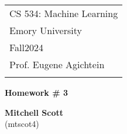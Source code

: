 \documentclass[a4paper,12pt]{article}
\theoremstyle{definition}
\theoremstyle{remark}
\begin{document}
	
	
	
	
	
	\thispagestyle{empty} %
	
	\begin{tabular}{p{15.5cm}} %
		{\large \sc CS 534:  Machine Learning} \\
		Emory University \\ Fall2024 \\ Prof. Eugene Agichtein \\
		\hline %
		\\
	\end{tabular} %
	
	\vspace*{0.3cm} %
	
	\begin{center} %
		{\Large \bf Homework \# 3} %
		\vspace{2mm}
		
		{\bf Mitchell Scott}\\ (mtscot4) %
		
	\end{center}  
	
	\vspace{0.4cm}
	
	
	
\end{document}

